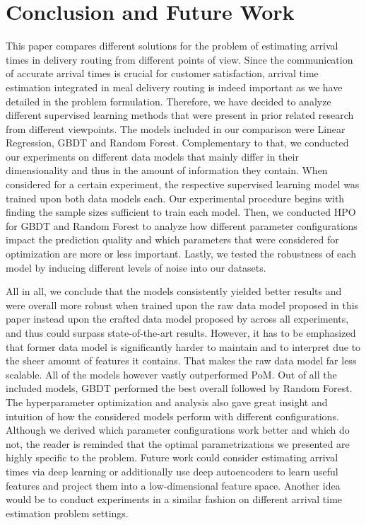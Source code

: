 \chapter{Conclusion and Future Work}\label{chap:conc}
This paper compares different solutions for the problem of estimating arrival times in delivery routing from different points of view. Since the communication of accurate arrival times is crucial for customer satisfaction, arrival time estimation integrated in meal delivery routing is indeed important as we have detailed in the problem formulation. Therefore, we have decided to analyze different supervised learning methods that were present in prior related research from different viewpoints. The models included in our comparison were Linear Regression, GBDT and Random Forest. Complementary to that, we conducted our experiments on different data models that mainly differ in their dimensionality and thus in the amount of information they contain. When considered for a certain experiment, the respective supervised learning model was trained upon both data models each. Our experimental procedure begins with finding the sample sizes sufficient to train each model. Then, we conducted HPO for GBDT and Random Forest to analyze how different parameter configurations impact the prediction quality and which parameters that were considered for optimization are more or less important. Lastly, we tested the robustness of each model by inducing different levels of noise into our datasets.

All in all, we conclude that the models consistently yielded better results and were overall more robust when trained upon the raw data model proposed in this paper instead upon the crafted data model proposed by \cite{Hildebrandt2020_EAT} across all experiments, and thus could surpass state-of-the-art results. However, it has to be emphasized that former data model is significantly harder to maintain and to interpret due to the sheer amount of features it contains. That makes the raw data model far less scalable. All of the models however vastly outperformed PoM. Out of all the included models, GBDT performed the best overall followed by Random Forest. The hyperparameter optimization and analysis also gave great insight and intuition of how the considered models perform with different configurations. Although we derived which parameter configurations work better and which do not, the reader is reminded that the optimal parametrizations we presented are highly specific to the problem. Future work could consider estimating arrival times via deep learning or additionally use deep autoencoders to learn useful features and project them into a low-dimensional feature space. Another idea would be to conduct experiments in a similar fashion on different arrival time estimation problem settings. 
